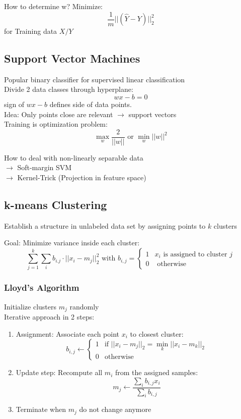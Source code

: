 How to determine w? Minimize:
\[\frac{1}{m} || (\hat{Y} - Y)||^2_2\]
for Training data \(X / Y\)

\subsection{Support Vector Machines}%
\label{ml:sub:support_vector_machines}
Popular binary classifier for supervised linear classification\\
Divide 2 data classes through hyperplane:
\[wx - b = 0\]
sign of \(wx - b\) defines side of data points.\\

Idea: Only points close are relevant \(\rightarrow\) support vectors\\

Training is optimization problem:
\[\max_w \frac{2}{|| w ||} \text{ or } \min_w ||w||^2\]

How to deal with non-linearly separable data\\
\(\rightarrow\) Soft-margin SVM\\
\(\rightarrow\) Kernel-Trick (Projection in feature space)


\subsection{k-means Clustering}%
\label{ml:sub:k_means_clustering}
Establish a structure in unlabeled data set by assigning points to \(k\) clusters

Goal: Minimize variance inside each cluster:
\[
  \sum_{j=1}^k \sum_i b_{i.j} \cdot || x_i - m_j ||^2_2
  \text{ with } b_{i,j} = \begin{cases} 1 & x_i \text{ is assigned to cluster } j\\ 0 & \text{ otherwise}\end{cases}
\]


\subsubsection{Lloyd's Algorithm}%
\label{ml:ssub:lloyds_algorithm}
Initialize clusters \(m_j\) randomly\\
Iterative approach in 2 steps:
\begin{enumerate}
\item Assignment: Associate each point \(x_i\) to closest cluster:
  \[
    b_{i, j} \leftarrow \begin{cases}1 & \text{if } || x_i - m_j ||_2 = \min_k || x_i - m_k ||_2\\
      0 & \text{otherwise}\end{cases}
  \]
\item Update step: Recompute all \(m_i\) from the assigned samples:
  \[
    m_j \leftarrow \frac{\sum_i b_{i,j} x_i}{\sum_i b_{i,j}}
  \]
\item Terminate when \(m_j\) do not change anymore
\end{enumerate}

